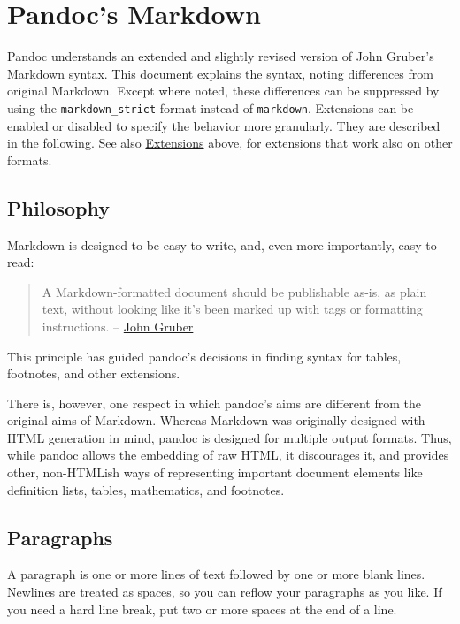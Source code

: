 \documentclass[
]{article}
\begin{document}
\hypertarget{pandocs-markdown}{%
\section{Pandoc's Markdown}\label{pandocs-markdown}}

Pandoc understands an extended and slightly revised version of John
Gruber's \href{https://daringfireball.net/projects/markdown/}{Markdown}
syntax. This document explains the syntax, noting differences from
original Markdown. Except where noted, these differences can be
suppressed by using the \texttt{markdown\_strict} format instead of
\texttt{markdown}. Extensions can be enabled or disabled to specify the
behavior more granularly. They are described in the following. See also
\protect\hyperlink{extensions}{Extensions} above, for extensions that
work also on other formats.

\hypertarget{philosophy}{%
\subsection{Philosophy}\label{philosophy}}

Markdown is designed to be easy to write, and, even more importantly,
easy to read:

\begin{quote}
A Markdown-formatted document should be publishable as-is, as plain
text, without looking like it's been marked up with tags or formatting
instructions. --
\href{https://daringfireball.net/projects/markdown/syntax\#philosophy}{John
Gruber}
\end{quote}

This principle has guided pandoc's decisions in finding syntax for
tables, footnotes, and other extensions.

There is, however, one respect in which pandoc's aims are different from
the original aims of Markdown. Whereas Markdown was originally designed
with HTML generation in mind, pandoc is designed for multiple output
formats. Thus, while pandoc allows the embedding of raw HTML, it
discourages it, and provides other, non-HTMLish ways of representing
important document elements like definition lists, tables, mathematics,
and footnotes.

\hypertarget{paragraphs}{%
\subsection{Paragraphs}\label{paragraphs}}

A paragraph is one or more lines of text followed by one or more blank
lines. Newlines are treated as spaces, so you can reflow your paragraphs
as you like. If you need a hard line break, put two or more spaces at
the end of a line.
\end{document}
